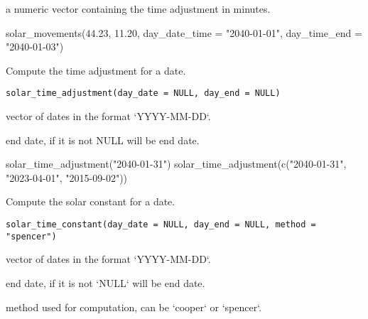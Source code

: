 \documentclass[a4paper]{book}
\begin{document}
%
\begin{Value}
a numeric vector containing the time adjustment in minutes.
\end{Value}
%
\begin{Examples}
\begin{ExampleCode}
solar_movements(44.23, 11.20, day_date_time = "2040-01-01", day_time_end = "2040-01-03")
\end{ExampleCode}
\end{Examples}
%
\begin{Description}\relax
Compute the time adjustment for a date.
\end{Description}
%
\begin{Usage}
\begin{verbatim}
solar_time_adjustment(day_date = NULL, day_end = NULL)
\end{verbatim}
\end{Usage}
%
\begin{Arguments}
\begin{ldescription}
\item[\code{day\_date}] vector of dates in the format `YYYY-MM-DD`.

\item[\code{day\_end}] end date, if it is not NULL will be end date.
\end{ldescription}
\end{Arguments}
%
\begin{Examples}
\begin{ExampleCode}
solar_time_adjustment("2040-01-31")
solar_time_adjustment(c("2040-01-31", "2023-04-01", "2015-09-02"))
\end{ExampleCode}
\end{Examples}
%
\begin{Description}\relax
Compute the solar constant for a date.
\end{Description}
%
\begin{Usage}
\begin{verbatim}
solar_time_constant(day_date = NULL, day_end = NULL, method = "spencer")
\end{verbatim}
\end{Usage}
%
\begin{Arguments}
\begin{ldescription}
\item[\code{day\_date}] vector of dates in the format `YYYY-MM-DD`.

\item[\code{day\_end}] end date, if it is not `NULL` will be end date.

\item[\code{method}] method used for computation, can be `cooper` or `spencer`.
\end{ldescription}
\end{Arguments}
\end{document}
